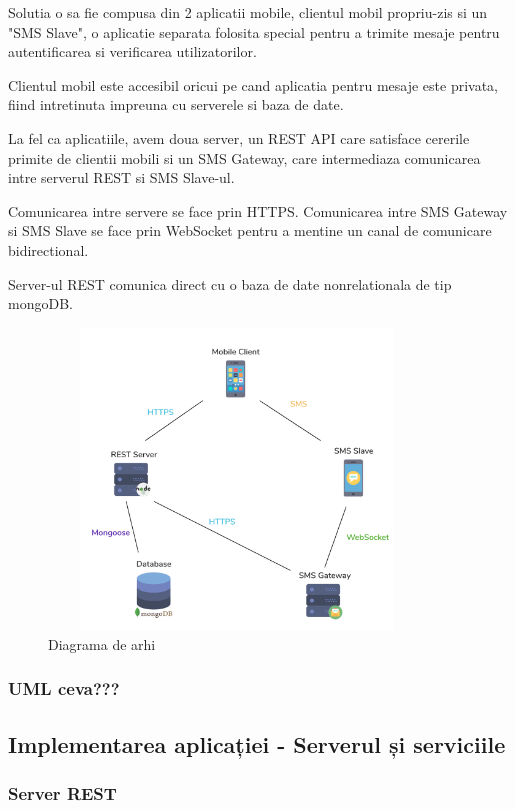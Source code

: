 \documentclass[12pt]{article}
\begin{document}
Solutia o sa fie compusa din 2 aplicatii mobile, clientul mobil propriu-zis
si un "SMS Slave", o aplicatie separata folosita special pentru a trimite mesaje
pentru autentificarea si verificarea utilizatorilor.

Clientul mobil este accesibil oricui pe cand aplicatia pentru mesaje este privata,
fiind intretinuta impreuna cu serverele si baza de date.

La fel ca aplicatiile, avem doua server, un REST API care satisface cererile primite
de clientii mobili si un SMS Gateway, care intermediaza comunicarea intre serverul REST
si SMS Slave-ul.

Comunicarea intre servere se face prin HTTPS.
Comunicarea intre SMS Gateway si SMS Slave se face prin WebSocket pentru a mentine
un canal de comunicare bidirectional.

Server-ul REST comunica direct cu o baza de date  nonrelationala de tip mongoDB.

\begin{figure}[H]
    \centering
    \includegraphics[width=10cm, height=8cm]{arhi.png}
    \caption{Diagrama de arhi}
    \end{figure}

\subsubsection{UML ceva???}

\subsection{Implementarea aplicației - Serverul și serviciile}

\subsubsection{Server REST}
\end{document}
